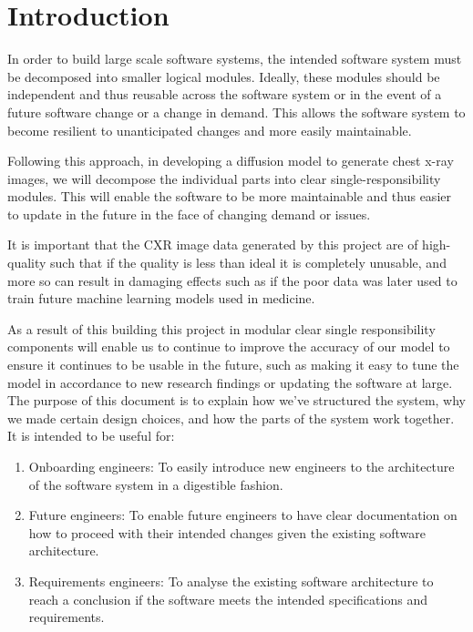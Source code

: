 \documentclass[12pt, titlepage]{article}
\begin{document}
\newpage

\tableofcontents

\listoftables

\listoffigures

\newpage


\section{Introduction}

In order to build large scale software systems, the intended software system must be decomposed into smaller logical modules. Ideally, these modules should be independent and thus reusable across the software system or in the event of a future software change or a change in demand. This allows the software system to become resilient to unanticipated changes and more easily maintainable.

Following this approach, in developing a diffusion model to generate chest x-ray images, we will decompose the individual parts into clear single-responsibility modules. This will enable the software to be more maintainable and thus easier to update in the future in the face of changing demand or issues.

It is important that the CXR image data generated by this project are of high-quality such that if the quality is less than ideal it is completely unusable, and more so can result in damaging effects such as if the poor data was later used to train future machine learning models used in medicine.

As a result of this building this project in modular clear single responsibility components will enable us to continue to improve the accuracy of our model to ensure it continues to be usable in the future, such as making it easy to tune the model in accordance to new research findings or updating the software at large.
The purpose of this document is to explain how we’ve structured the system, why we made certain design choices, and how the parts of the system work together. It is intended to be useful for:

\begin{enumerate}
  \item Onboarding engineers: To easily introduce new engineers to the architecture of the software system in a digestible fashion.
  \item Future engineers: To enable future engineers to have clear documentation on how to proceed with their intended changes given the existing software architecture.
  \item Requirements engineers: To analyse the existing software architecture to reach a conclusion if the software meets the intended specifications and requirements.
\end{enumerate}
\end{document}
